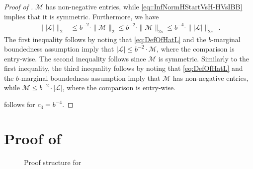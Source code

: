 \documentclass[11pt,reqno]{amsart}
\numberwithin{equation}{section}
\newcommand{\cL}{{\mathcal{L}}}
\newcommand{\cM}{{\mathcal{M}}}
\newcommand{\blue}[1]{{\color{blue}#1}}
\newcommand{\bluepigment}[1]{{\color{blue(pigment)}#1}}
\newcommand{\darkmagenta}[1]{{\color{darkmagenta}#1}}
\newcommand{\goldenbrown}[1]{{\color{goldenbrown}#1}}
\newcommand{\rosegold}[1]{{\color{rosegold}#1}}
\newcommand{\pfs}{\darkmagenta{s}}
\newcommand{\norm}[2]{\goldenbrown{\|} #1 \goldenbrown{\|}_{#2}}
\newcommand{\abs}[1]{\blue{|}#1\blue{|}}
\newcommand{\spreadpoint}{\newpage}
\newcommand{\LastReviewG}[1]{{\color{magenta}\hspace{.2cm} [Rev: \textrm{#1} - \bluepigment{G} ] \hspace{.2cm}}}
\renewcommand{\LastReviewG}[1]{}
\renewcommand{\spreadpoint}{}
\renewcommand{\blue}[1]{#1}
\renewcommand{\bluepigment}[1]{#1}
\renewcommand{\darkmagenta}[1]{#1}
\renewcommand{\goldenbrown}[1]{#1}
\renewcommand{\rosegold}[1]{#1}
\newcommand{\ExtdInfMatrix}{\rosegold{\cL}}
\begin{document}
\begin{proof}[Proof of ]
$\cM$ has non-negative entries, while \eqref{eq::InfNormHStartVsH-HVsIBB} implies that it is symmetric. 
Furthermore, we have 
\begin{align}\label{eq:L2BoundInflNoNuMatrixNoMaxB}
\norm{ \abs{\ExtdInfMatrix}}{2}   &\leq b^{-2} \cdot \norm{  \cM }{2} 
 \leq b^{-2} \cdot \norm{ \cM}{2\pfs} 
 \leq b^{-4} \cdot \norm{ \abs{\ExtdInfMatrix}}{2\pfs} \enspace. 
\end{align}
The first inequality follows by noting that   \eqref{eq:DefOfHatL} and the $b$-marginal boundedness assumption imply 
that $\abs{\ExtdInfMatrix} \leq b^{-2} \cdot \cM$, where the comparison is entry-wise.  The second inequality follows since 
$\cM$ is symmetric. Similarly to the first inequality, the third inequality follows by noting that  \eqref{eq:DefOfHatL} and the $b$-marginal
boundedness assumption imply that $\cM$ has non-negative entries, while  $\cM \leq b^{-2}\cdot \abs{\ExtdInfMatrix}$, 
where the comparison is entry-wise. 

 follows for $c_3=b^{-4}$.
\end{proof}

\spreadpoint


\newcommand{\ExtdInfMatrixL}{\mathcal{D}} 

\section{Proof of  \LastReviewG{2025-04-03} } \label{sec:thrm:InfNormBoundHConj}


\begin{figure}
 \centering
{}
		\caption{Proof structure for }
	\label{fig:Strct4thrm:InfNormBoundHConj}
\end{figure}
\end{document}
